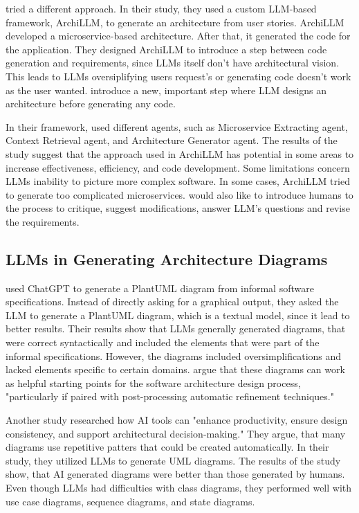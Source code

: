 \textcite{calamoUserStoriesArchitectures2026} tried a different approach. In their study, they used a custom LLM-based framework, ArchiLLM, to generate an architecture from user stories. ArchiLLM developed a microservice-based architecture. After that, it generated the code for the application. They designed ArchiLLM to introduce a step between code generation and requirements, since LLMs itself don't have architectural vision. This leads to LLMs oversiplifying users request's or generating code doesn't work as the user wanted. \citeauthor{calamoUserStoriesArchitectures2026} introduce a new, important step where LLM designs an architecture before generating any code.

In their framework, \citeauthor{calamoUserStoriesArchitectures2026} used different agents, such as Microservice Extracting agent, Context Retrieval agent, and Architecture Generator agent. The results of the study suggest that the approach used in ArchiLLM has potential in some areas to increase effectiveness, efficiency, and code development. Some limitations concern LLMs inability to picture more complex software. In some cases, ArchiLLM tried to generate too complicated microservices. \citeauthor{calamoUserStoriesArchitectures2026} would also like to introduce humans to the process to critique, suggest modifications, answer LLM's questions and revise the requirements.

\subsection{LLMs in Generating Architecture Diagrams}
\textcite{tagliaferroLeveragingLLMsAutomate2025} used ChatGPT to generate a PlantUML diagram from informal software specifications. Instead of directly asking for a graphical output, they asked the LLM to generate a PlantUML diagram, which is a textual model, since it lead to better results. Their results show that LLMs generally generated diagrams, that were correct syntactically and included the elements that were part of the informal specifications. However, the diagrams included oversimplifications and lacked elements specific to certain domains. \citeauthor{tagliaferroLeveragingLLMsAutomate2025} argue that these diagrams can work as helpful starting points for the software architecture design process, "particularly if paired with post-processing automatic refinement techniques."

Another study \parencite{ramachandranTransformingSoftwareArchitecture2025} researched how AI tools can "enhance productivity, ensure design consistency, and support architectural decision-making." They argue, that many diagrams use repetitive patters that could be created automatically. In their study, they utilized LLMs to generate UML diagrams. The results of the study show, that AI generated diagrams were better than those generated by humans. Even though LLMs had difficulties with class diagrams, they performed well with use case diagrams, sequence diagrams, and state diagrams.

